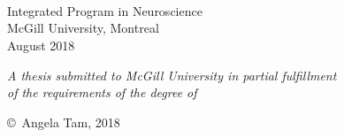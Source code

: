 \documentclass[
12pt, %
oneside, %
english, %
onehalfspacing, %
liststotoc, %
toctotoc, %
headsepline, %
consistentlayout, %
]{MastersDoctoralThesis} %
\author{\textsc{Angela Tam}} %
\begin{document}
\frontmatter %

\pagestyle{plain} %


\begin{titlepage}
\begin{center}

\vspace*{.06\textheight}

\HRule \\[0.4cm] %
{\huge \bfseries \ttitle\par}\vspace{0.4cm} %
\HRule \\[1.5cm] %


{\Large \authorname}\\ %
Integrated Program in Neuroscience\\
McGill University, Montreal\\
August 2018

\vfill

\small \textit{A thesis submitted to McGill University in partial fulfillment\\ of the requirements of the degree of \degreename}\\[0.3cm] %


\vfill

{\small \copyright\ Angela Tam, 2018}\\[1cm] %

\vfill
\end{center}
\end{titlepage}

\end{document}
